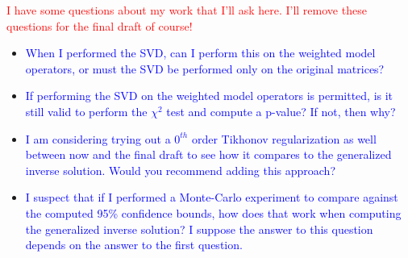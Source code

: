 \textcolor{red}{I have some questions about my work that I'll ask here. I'll remove these questions for the final draft of course!} 
\begin{itemize}
	\item \textcolor{blue}{When I performed the SVD, can I perform this on the weighted model operators, or must the SVD be performed only on the original matrices?}
	\item \textcolor{blue}{If performing the SVD on the weighted model operators is permitted, is it still valid to perform the $\chi^2$ test and compute a p-value? If not, then why?}
	\item \textcolor{blue}{I am considering trying out a $0^{th}$ order Tikhonov regularization as well between now and the final draft to see how it compares to the generalized inverse solution. Would you recommend adding this approach?}
	\item \textcolor{blue}{I suspect that if I performed a Monte-Carlo experiment to compare against the computed 95\% confidence bounds, how does that work when computing the generalized inverse solution? I suppose the answer to this question depends on the answer to the first question.}
\end{itemize}

